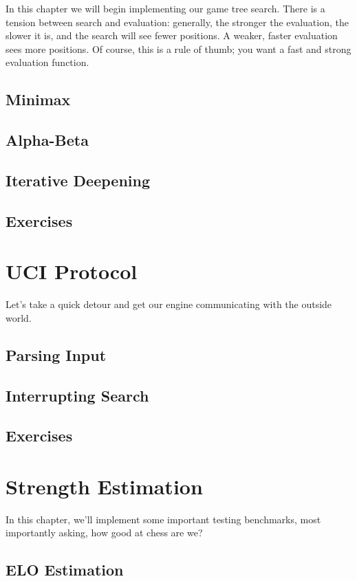 \documentclass[letterpaper,11pt]{article}
\begin{document}
In this chapter we will begin implementing our game tree search. There is a tension between
search and evaluation: generally, the stronger the evaluation, the slower it is,
and the search will see fewer positions. A weaker, faster evaluation sees more positions.
Of course, this is a rule of thumb; you want a fast and strong evaluation function. 

\subsection{Minimax}
\subsection{Alpha-Beta}
\subsection{Iterative Deepening}
\subsection{Exercises}

\section{UCI Protocol}

Let's take a quick detour and get our engine communicating with the outside world.

\subsection{Parsing Input}
\subsection{Interrupting Search}
\subsection{Exercises}

\section{Strength Estimation}

In this chapter, we'll implement some important testing benchmarks, most importantly asking,
how good at chess are we?

\subsection{ELO Estimation}
\end{document}
